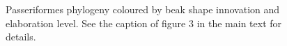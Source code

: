 \documentclass[sn-mathphys]{sn-jnl}%
\theoremstyle{thmstyleone}%
\theoremstyle{thmstyletwo}%
\theoremstyle{thmstylethree}%
\begin{document}
\begin{figure}[!htbp]
\centering
\caption{Passeriformes phylogeny coloured by beak shape innovation and elaboration level. See the caption of figure 3 in the main text for details.}
\label{fig_phylogeny_passeriformes}
\end{figure}




\end{document}
